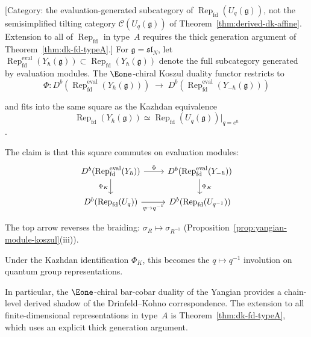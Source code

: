 \begin{theorem}\label{thm:derived-dk-yangian}
\textup{[Category: the evaluation-generated subcategory of
$\operatorname{Rep}_{\mathrm{fd}}(U_q(\mathfrak{g}))$,
not the semisimplified tilting category
$\mathcal{C}(U_q(\mathfrak{g}))$ of
Theorem~\textup{\ref{thm:derived-dk-affine}}.
Extension to all of
$\operatorname{Rep}_{\mathrm{fd}}$ in type~$A$
requires the thick generation argument of
Theorem~\textup{\ref{thm:dk-fd-typeA}}.]}
For $\mathfrak{g} = \mathfrak{sl}_N$, let
$\operatorname{Rep}_{\mathrm{fd}}^{\mathrm{eval}}(Y_\hbar(\mathfrak{g}))
\subset \operatorname{Rep}_{\mathrm{fd}}(Y_\hbar(\mathfrak{g}))$
denote the full subcategory generated by evaluation modules.
The $\Eone$-chiral Koszul duality functor restricts to
\[
\Phi \colon D^b(\operatorname{Rep}_{\mathrm{fd}}^{\mathrm{eval}}(Y_\hbar(\mathfrak{g})))
\;\to\;
D^b(\operatorname{Rep}_{\mathrm{fd}}^{\mathrm{eval}}(Y_{-\hbar}(\mathfrak{g})))
\]

and fits into the same square as the Kazhdan equivalence
\[
\operatorname{Rep}_{\mathrm{fd}}(Y_\hbar(\mathfrak{g}))
\simeq
\operatorname{Rep}_{\mathrm{fd}}(U_q(\mathfrak{g}))
\big|_{q = e^\hbar}
\]
\cite{Drinfeld85}.

The claim is that this square commutes on evaluation modules:
\begin{equation}\label{eq:dk-square-yangian}
\begin{tikzcd}
D^b(\operatorname{Rep}_{\mathrm{fd}}^{\mathrm{eval}}(Y_\hbar))
  \ar[r, "\Phi"]
  \ar[d, "\Phi_K"']
& D^b(\operatorname{Rep}_{\mathrm{fd}}^{\mathrm{eval}}(Y_{-\hbar}))
  \ar[d, "\Phi_K"]
\\
D^b(\operatorname{Rep}_{\mathrm{fd}}(U_q))
  \ar[r, "q \mapsto q^{-1}"']
& D^b(\operatorname{Rep}_{\mathrm{fd}}(U_{q^{-1}}))
\end{tikzcd}
\end{equation}

The top arrow reverses the braiding:
$\sigma_R \mapsto \sigma_{R^{-1}}$
\textup{(}Proposition~\textup{\ref{prop:yangian-module-koszul}(iii))}.

Under the Kazhdan identification $\Phi_K$, this becomes the
$q \mapsto q^{-1}$ involution on quantum group representations.

In particular, the $\Eone$-chiral bar-cobar duality of the Yangian
provides a chain-level derived shadow of the Drinfeld--Kohno
correspondence.  The extension to all finite-dimensional
representations in type~$A$ is Theorem~\textup{\ref{thm:dk-fd-typeA}},
which uses an explicit thick generation argument.
\end{theorem}


